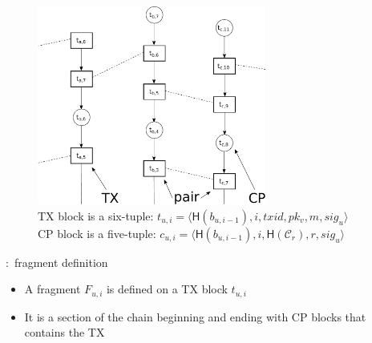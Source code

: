 \documentclass{beamer}
\newcommand{\C}{\mathcal{C}}
\begin{document}
\begin{frame}{\subsecname}
  \begin{figure}[h]
  \includegraphics[width=0.67\textwidth]{trustchain-good-cp}
  \centering
  \caption*{TX block is a six-tuple: $t_{u, i} = \langle \textsf{H}(b_{u, i - 1}), i, txid, pk_v, m, sig_u \rangle$\\
    CP block is a five-tuple: $c_{u, i} = \langle \textsf{H}(b_{u, i-1}), i, \textsf{H}(\C_r), r, sig_u \rangle$}
  \end{figure}
\end{frame}

\begin{frame}{\subsecname:~fragment definition}
\begin{itemize}
\item A fragment $F_{u, i}$ is defined on a TX block $t_{u, i}$
\item It is a section of the chain beginning and ending with CP blocks that contains the TX
\end{itemize}
\end{frame}
\end{document}
